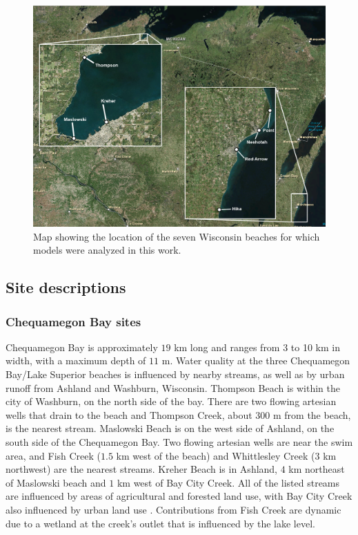 \documentclass[authoryear,review, 12pt]{elsarticle}
\begin{document}
\begin{figure}
\includegraphics[width=\textwidth]{fig1/FIG1.png}
\caption{Map showing the location of the seven Wisconsin beaches for which models were analyzed in this work.
}
\end{figure}

\subsection{Site descriptions}\label{site-descriptions}

\subsubsection{Chequamegon Bay sites}\label{chequamegon-bay-sites}

Chequamegon Bay is approximately \(19\) km long and ranges from 3 to 10
km in width, with a maximum depth of \(11\) m. Water quality at the
three Chequamegon Bay/Lake Superior beaches is influenced by nearby
streams, as well as by urban runoff from Ashland and Washburn,
Wisconsin. Thompson Beach is within the city of Washburn, on the
north side of the bay. There are two flowing artesian wells that drain
to the beach and Thompson Creek, about \(300\) m from the beach, is the
nearest stream. Maslowski Beach is on the west side of Ashland, on the
south side of the Chequamegon Bay. Two flowing artesian wells are near the swim area, and
Fish Creek (\(1.5\) km west of the beach) and Whittlesley Creek (\(3\)
km northwest) are the nearest streams. Kreher Beach is in Ashland, \(4\)
km northeast of Maslowski beach and \(1\) km west of Bay City Creek. All of the listed streams are influenced by
areas of agricultural and forested land use, with Bay City Creek also
influenced by urban land use \citep{Francy-et-al-2013}. Contributions
from Fish Creek are dynamic due to a wetland at the creek's outlet that
is influenced by the lake level.
\end{document}
